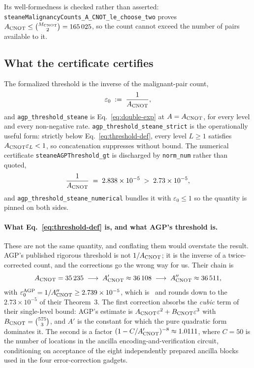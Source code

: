 \documentclass[aps,prx,reprint,nofootinbib,superscriptaddress]{revtex4-2}
\begin{document}
Its well-formedness is checked rather than asserted:
\texttt{steaneMalignancyCounts\_A\_CNOT\_le\_choose\_two} proves
$A_{\rm CNOT} \le \binom{M_{\rm CNOT}}{2} = 165\,025$, so the count cannot exceed
the number of pairs available to it.

\subsection{What the certificate certifies}

The formalized threshold is the inverse of the malignant-pair count,
\begin{equation}
  \varepsilon_0 \;:=\; \frac{1}{A_{\rm CNOT}},
  \label{eq:threshold-def}
\end{equation}
and \texttt{agp\_threshold\_steane} is Eq.~\eqref{eq:double-exp} at
$A = A_{\rm CNOT}$, for every level and every non-negative rate.
\texttt{agp\_threshold\_steane\_strict} is the operationally useful form:
strictly below Eq.~\eqref{eq:threshold-def}, every level $L \ge 1$ satisfies
$A_{\rm CNOT}\varepsilon_L < 1$, so concatenation suppresses without bound. The
numerical certificate \texttt{steaneAGPThreshold\_gt} is discharged by
\texttt{norm\_num} rather than quoted,
\begin{equation}
  \frac{1}{A_{\rm CNOT}} \;=\; 2.838 \times 10^{-5} \;>\; 2.73 \times 10^{-5},
  \label{eq:threshold-numeric}
\end{equation}
and \texttt{agp\_threshold\_steane\_numerical} bundles it with
$\varepsilon_0 \le 1$ so the quantity is pinned on both sides.

\paragraph{What Eq.~\eqref{eq:threshold-def} is, and what AGP's threshold is.}
These are not the same quantity, and conflating them would overstate the result.
AGP's published rigorous threshold is not $1/A_{\rm CNOT}$; it is the inverse of
a twice-corrected count, and the corrections go the wrong way for us. Their
chain is
\begin{equation}
  A_{\rm CNOT} = 35\,235
  \;\longrightarrow\; A'_{\rm CNOT} \approx 36\,108
  \;\longrightarrow\; A''_{\rm CNOT} \approx 36\,511,
  \label{eq:agp-chain}
\end{equation}
with $\varepsilon_0^{\rm AGP} = 1/A''_{\rm CNOT} \ge 2.739 \times 10^{-5}$,
which is~\cite[Eq.~(36)]{AGP2006} and rounds down to the
$2.73 \times 10^{-5}$ of their Theorem~3. The first correction absorbs the
\emph{cubic} term of their single-level bound: AGP's estimate is
$A_{\rm CNOT}\varepsilon^2 + B_{\rm CNOT}\varepsilon^3$ with
$B_{\rm CNOT} = \binom{575}{3}$, and $A'$ is the constant for which the pure
quadratic form dominates it. The second is a factor
$(1 - C/A'_{\rm CNOT})^{-8} \approx 1.0111$, where $C = 50$ is the number of
locations in the ancilla encoding-and-verification circuit, conditioning on
acceptance of the eight independently prepared ancilla blocks used in the four
error-correction gadgets.
\end{document}
